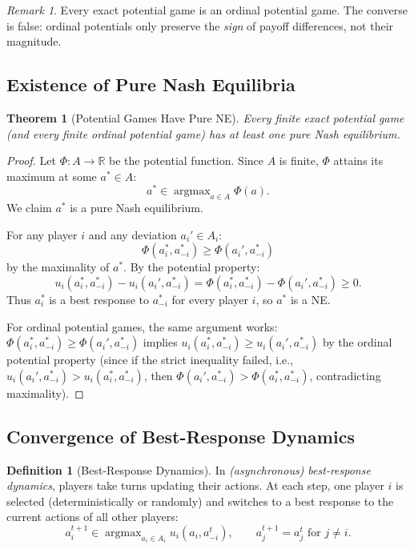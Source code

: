 \documentclass[11pt,a4paper]{article}
\theoremstyle{definition}
\newtheorem{definition}{Definition}[section]
\theoremstyle{plain}
\newtheorem{theorem}{Theorem}[section]
\theoremstyle{remark}
\newtheorem{remark}{Remark}[section]
\newcommand{\R}{\mathbb{R}}
\DeclareMathOperator{\argmax}{argmax}
\begin{document}
\begin{remark}
Every exact potential game is an ordinal potential game. The converse is false: ordinal
potentials only preserve the \emph{sign} of payoff differences, not their magnitude.
\end{remark}

\subsection{Existence of Pure Nash Equilibria}

\begin{theorem}[Potential Games Have Pure NE]
\label{thm:potential-pure-ne}
Every finite exact potential game (and every finite ordinal potential game) has at least one
pure Nash equilibrium.
\end{theorem}

\begin{proof}
Let $\Phi : A \to \R$ be the potential function. Since $A$ is finite, $\Phi$ attains its
maximum at some $a^* \in A$:
\[
    a^* \in \argmax_{a \in A} \Phi(a).
\]
We claim $a^*$ is a pure Nash equilibrium.

For any player $i$ and any deviation $a_i' \in A_i$:
\[
    \Phi(a_i^*, a_{-i}^*) \geq \Phi(a_i', a_{-i}^*)
\]
by the maximality of $a^*$. By the potential property:
\[
    u_i(a_i^*, a_{-i}^*) - u_i(a_i', a_{-i}^*)
    = \Phi(a_i^*, a_{-i}^*) - \Phi(a_i', a_{-i}^*) \geq 0.
\]
Thus $a_i^*$ is a best response to $a_{-i}^*$ for every player $i$, so $a^*$ is a NE.

For ordinal potential games, the same argument works: $\Phi(a_i^*, a_{-i}^*) \geq
\Phi(a_i', a_{-i}^*)$ implies $u_i(a_i^*, a_{-i}^*) \geq u_i(a_i', a_{-i}^*)$ by the
ordinal potential property (since if the strict inequality failed, i.e.,
$u_i(a_i', a_{-i}^*) > u_i(a_i^*, a_{-i}^*)$, then
$\Phi(a_i', a_{-i}^*) > \Phi(a_i^*, a_{-i}^*)$, contradicting maximality).
\end{proof}

\subsection{Convergence of Best-Response Dynamics}

\begin{definition}[Best-Response Dynamics]
\label{def:br-dynamics}
In \emph{(asynchronous) best-response dynamics}, players take turns updating their actions.
At each step, one player $i$ is selected (deterministically or randomly) and switches to a
best response to the current actions of all other players:
\[
    a_i^{t+1} \in \argmax_{a_i \in A_i} u_i(a_i, a_{-i}^t),
    \qquad a_j^{t+1} = a_j^t \text{ for } j \neq i.
\]
\end{definition}
\end{document}
